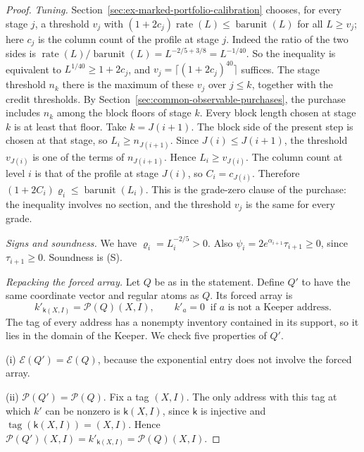 \begin{proof}
\emph{Tuning.} Section~\ref{sec:ex-marked-portfolio-calibration}
chooses, for every stage $j$, a threshold $v_j$ with
$(1+2c_j)\operatorname{rate}(L)\le\operatorname{barunit}(L)$ for all
$L\ge v_j$; here $c_j$ is the column count of the profile at stage $j$.
Indeed the ratio of the two sides is
$\operatorname{rate}(L)/\operatorname{barunit}(L)=L^{-2/5+3/8}=L^{-1/40}$.
So the inequality is equivalent to $L^{1/40}\ge1+2c_j$, and
$v_j=\lceil(1+2c_j)^{40}\rceil$ suffices. The stage threshold $n_k$
there is the maximum of these $v_j$ over $j\le k$, together with the
credit thresholds. By Section~\ref{sec:common-observable-purchases},
the purchase includes $n_k$ among the block floors of stage $k$. Every
block length chosen at stage $k$ is at least that floor. Take
$k=J(i+1)$. The block side of the present step is chosen at that stage,
so $L_i\ge n_{J(i+1)}$. Since $J(i)\le J(i+1)$, the threshold
$v_{J(i)}$ is one of the terms of $n_{J(i+1)}$. Hence
$L_i\ge v_{J(i)}$. The column count at level $i$ is that of the profile
at stage $J(i)$, so $C_i=c_{J(i)}$. Therefore
$(1+2C_i)\varrho_i\le\operatorname{barunit}(L_i)$. This is the
grade-zero clause of the purchase: the inequality involves no section,
and the threshold $v_j$ is the same for every grade.

\emph{Signs and soundness.} We have $\varrho_i=L_i^{-2/5}>0$. Also
$\psi_i=2e^{\alpha_{i+1}}\tau_{i+1}\ge0$, since $\tau_{i+1}\ge0$.
Soundness is (S).

\emph{Repacking the forced array.} Let $Q$ be as in the statement. Define
$Q'$ to have the same coordinate vector and regular atoms as $Q$. Its
forced array is
\[
 k'_{\mathsf k(X,I)}=\mathcal P(Q)(X,I),\qquad
 k'_a=0\ \text{ if $a$ is not a Keeper address}.
\]
The tag of every address has a nonempty inventory contained in its
support, so it lies in the domain of the Keeper. We check five
properties of $Q'$.

(i) $\mathcal E(Q')=\mathcal E(Q)$, because the exponential entry does
not involve the forced array.

(ii) $\mathcal P(Q')=\mathcal P(Q)$. Fix a tag $(X,I)$. The only address
with this tag at which $k'$ can be nonzero is $\mathsf k(X,I)$, since
$\mathsf k$ is injective and $\operatorname{tag}(\mathsf k(X,I))=(X,I)$.
Hence $\mathcal P(Q')(X,I)=k'_{\mathsf k(X,I)}=\mathcal P(Q)(X,I)$.


\end{proof}

